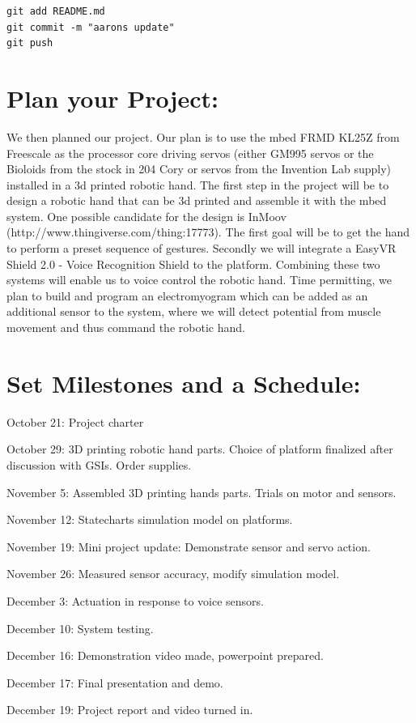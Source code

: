 \documentclass[twoside]{article}
\begin{document}
\vspace{-5mm}
\begin{lstlisting}[mathescape, frame=single]
git add README.md
git commit -m "aarons update"
git push
\end{lstlisting}

\section{Plan your Project:}
We then planned our project. Our plan is to use the mbed FRMD KL25Z from Freescale as the processor core driving servos (either GM995 servos or the Bioloids from the stock in 204 Cory or servos from the Invention Lab supply) installed in a 3d printed robotic hand. The first step in the project will be to design a robotic hand that can be 3d printed and assemble it with the mbed system. One possible candidate for the design is InMoov (http://www.thingiverse.com/thing:17773). The first goal will be to get the hand to perform a preset sequence of gestures. Secondly we will integrate a EasyVR Shield 2.0 - Voice Recognition Shield to the platform. Combining these two systems will enable us to voice control the robotic hand. Time permitting, we plan to build and program an electromyogram which can be added as an additional sensor to the system, where we will detect potential from muscle movement and thus command the robotic hand.

\section*{Set Milestones and a Schedule:}
\begin{compactitem}
\item October 21: Project charter
\item October 29: 3D printing robotic hand parts. Choice of platform finalized after discussion with GSIs. Order supplies.
\item November 5: Assembled 3D printing hands parts. Trials on motor and sensors.
\item November 12: Statecharts simulation model on platforms.
\item November 19: Mini project update: Demonstrate sensor and servo action.
\item November 26: Measured sensor accuracy, modify simulation model.
\item December 3: Actuation in response to voice sensors.
\item December 10: System testing.
\item December 16: Demonstration video made, powerpoint prepared.
\item December 17: Final presentation and demo.
\item December 19: Project report and video turned in. 
\end{compactitem}
\end{document}
